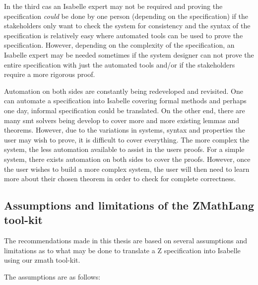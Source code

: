 In the third cas an Isabelle expert may not be
required and proving the specification \textit{could} be done by one person
(depending on the specification) if the stakeholders only want to check the system for consistency
and
the syntax of the specification is relatively easy where automated tools can be
used to prove the specification. However, depending on the complexity of the
specification, an Isabelle expert may be needed sometimes if the system designer
can not prove the entire specification with just the automated tools and/or if
the stakeholders require a more rigorous proof.

Automation on both sides are constantly being redeveloped and revisited. One can
automate a specification into Isabelle covering formal methods and perhaps one
day, informal specification could be translated. On the other end, there are
many \gls{smt} solvers being develop to cover more and more existing lemmas and
theorems. However, due to the variations in systems, syntax and properties the
user may wish to prove, it is difficult to cover everything. The more complex
the system, the less automation available to assist in the users proofs. For a
simple system, there exists automation on both sides to cover the proofs.
However, once the user wishes to build a more complex system, the user will then
need to learn more about their chosen theorem in order to check for complete
correctness.

\subsection{Assumptions and limitations of the ZMathLang tool-kit}

The recommendations made in this thesis are based on several assumptions and
limitations as to what may be done to translate a Z specification into Isabelle
using our \gls{zmath} tool-kit.

The assumptions are as follows:


